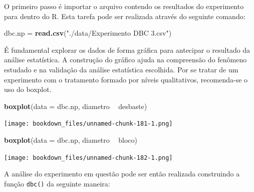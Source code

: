 \documentclass[
]{article}
\newenvironment{Shaded}{\begin{snugshade}}{\end{snugshade}}
\newcommand{\DataTypeTok}[1]{\textcolor[rgb]{0.13,0.29,0.53}{#1}}
\newcommand{\KeywordTok}[1]{\textcolor[rgb]{0.13,0.29,0.53}{\textbf{#1}}}
\newcommand{\NormalTok}[1]{#1}
\newcommand{\OperatorTok}[1]{\textcolor[rgb]{0.81,0.36,0.00}{\textbf{#1}}}
\newcommand{\StringTok}[1]{\textcolor[rgb]{0.31,0.60,0.02}{#1}}
\begin{document}
O primeiro passo é importar o arquivo contendo os resultados do experimento para dentro do R. Esta tarefa pode ser realizada através do seguinte comando:

\begin{Shaded}
\begin{Highlighting}[]
\NormalTok{dbc.np =}\StringTok{ }\KeywordTok{read.csv}\NormalTok{(}\StringTok{"./data/Experimento DBC 3.csv"}\NormalTok{)}
\end{Highlighting}
\end{Shaded}

É fundamental explorar os dados de forma gráfica para antecipar o resultado da análise estatística. A construção do gráfico ajuda na compreensão do fenômeno estudado e na validação da análise estatística escolhida. Por se tratar de um experimento com o tratamento formado por níveis qualitativos, recomenda-se o uso do boxplot.

\begin{Shaded}
\begin{Highlighting}[]
\KeywordTok{boxplot}\NormalTok{(}\DataTypeTok{data =}\NormalTok{ dbc.np, diametro }\OperatorTok{~}\StringTok{ }\NormalTok{desbaste)}
\end{Highlighting}
\end{Shaded}

\texttt{[image: bookdown\_files/unnamed-chunk-181-1.png]}

\begin{Shaded}
\begin{Highlighting}[]
\KeywordTok{boxplot}\NormalTok{(}\DataTypeTok{data =}\NormalTok{ dbc.np, diametro }\OperatorTok{~}\StringTok{ }\NormalTok{bloco)}
\end{Highlighting}
\end{Shaded}

\texttt{[image: bookdown\_files/unnamed-chunk-182-1.png]}

A análise do experimento em questão pode ser então realizada construindo a função \texttt{dbc()} da seguinte maneira:

\begin{Shaded}
\end{Shaded}
\end{document}
